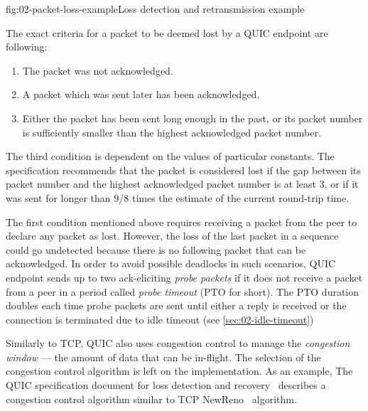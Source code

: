 \begin{myFigure}{fig:02-packet-loss-example}{Loss detection and retransmission example}

\resizebox{\linewidth}{!}{}

\end{myFigure}

The exact criteria for a packet to be deemed lost by a QUIC endpoint are following:

\begin{enumerate}

  \item The packet was not acknowledged.

  \item A packet which was sent later has been acknowledged.

  \item Either the packet has been sent long enough in the past, or its packet number is
sufficiently smaller than the highest acknowledged packet number.

\end{enumerate}

The third condition is dependent on the values of particular constants. The specification recommends
that the packet is considered lost if the gap between its packet number and the highest acknowledged
packet number is at least 3, or if it was sent for longer than $9/8$ times the estimate of the
current round-trip time.

The first condition mentioned above requires receiving a packet from the peer to declare any packet
as lost. However, the loss of the last packet in a sequence could go undetected because there is no
following packet that can be acknowledged. In order to avoid possible deadlocks in such scenarios,
QUIC endpoint sends up to two ack-eliciting \textit{probe packets} if it does not receive a packet
from a peer in a period called \textit{probe timeout} (PTO for short). The PTO duration doubles each
time probe packets are sent until either a reply is received or the connection is terminated due to
idle timeout (see \autoref{sec:02-idle-timeout})

Similarly to TCP, QUIC also uses congestion control to manage the \textit{congestion window} --- the
amount of data that can be in-flight. The selection of the congestion control algorithm is left on
the implementation. As an example, The QUIC specification document for loss detection and
recovery~\autocite[Section~7]{draft-ietf-quic-recovery} describes a congestion control algorithm
similar to TCP NewReno~\cite{rfc6582} algorithm.

